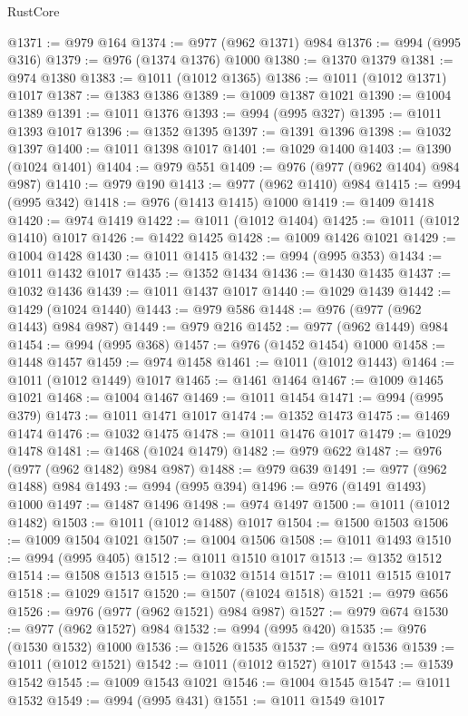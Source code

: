 \begin{lexlean}{RustCore}
\begin{coremodule}
@1371 := @979 @164
@1374 := @977 (@962 @1371) @984
@1376 := @994 (@995 @316)
@1379 := @976 (@1374 @1376) @1000
@1380 := @1370 @1379
@1381 := @974 @1380
@1383 := @1011 (@1012 @1365)
@1386 := @1011 (@1012 @1371) @1017
@1387 := @1383 @1386
@1389 := @1009 @1387 @1021
@1390 := @1004 @1389
@1391 := @1011 @1376
@1393 := @994 (@995 @327)
@1395 := @1011 @1393 @1017
@1396 := @1352 @1395
@1397 := @1391 @1396
@1398 := @1032 @1397
@1400 := @1011 @1398 @1017
@1401 := @1029 @1400
@1403 := @1390 (@1024 @1401)
@1404 := @979 @551
@1409 := @976 (@977 (@962 @1404) @984 @987)
@1410 := @979 @190
@1413 := @977 (@962 @1410) @984
@1415 := @994 (@995 @342)
@1418 := @976 (@1413 @1415) @1000
@1419 := @1409 @1418
@1420 := @974 @1419
@1422 := @1011 (@1012 @1404)
@1425 := @1011 (@1012 @1410) @1017
@1426 := @1422 @1425
@1428 := @1009 @1426 @1021
@1429 := @1004 @1428
@1430 := @1011 @1415
@1432 := @994 (@995 @353)
@1434 := @1011 @1432 @1017
@1435 := @1352 @1434
@1436 := @1430 @1435
@1437 := @1032 @1436
@1439 := @1011 @1437 @1017
@1440 := @1029 @1439
@1442 := @1429 (@1024 @1440)
@1443 := @979 @586
@1448 := @976 (@977 (@962 @1443) @984 @987)
@1449 := @979 @216
@1452 := @977 (@962 @1449) @984
@1454 := @994 (@995 @368)
@1457 := @976 (@1452 @1454) @1000
@1458 := @1448 @1457
@1459 := @974 @1458
@1461 := @1011 (@1012 @1443)
@1464 := @1011 (@1012 @1449) @1017
@1465 := @1461 @1464
@1467 := @1009 @1465 @1021
@1468 := @1004 @1467
@1469 := @1011 @1454
@1471 := @994 (@995 @379)
@1473 := @1011 @1471 @1017
@1474 := @1352 @1473
@1475 := @1469 @1474
@1476 := @1032 @1475
@1478 := @1011 @1476 @1017
@1479 := @1029 @1478
@1481 := @1468 (@1024 @1479)
@1482 := @979 @622
@1487 := @976 (@977 (@962 @1482) @984 @987)
@1488 := @979 @639
@1491 := @977 (@962 @1488) @984
@1493 := @994 (@995 @394)
@1496 := @976 (@1491 @1493) @1000
@1497 := @1487 @1496
@1498 := @974 @1497
@1500 := @1011 (@1012 @1482)
@1503 := @1011 (@1012 @1488) @1017
@1504 := @1500 @1503
@1506 := @1009 @1504 @1021
@1507 := @1004 @1506
@1508 := @1011 @1493
@1510 := @994 (@995 @405)
@1512 := @1011 @1510 @1017
@1513 := @1352 @1512
@1514 := @1508 @1513
@1515 := @1032 @1514
@1517 := @1011 @1515 @1017
@1518 := @1029 @1517
@1520 := @1507 (@1024 @1518)
@1521 := @979 @656
@1526 := @976 (@977 (@962 @1521) @984 @987)
@1527 := @979 @674
@1530 := @977 (@962 @1527) @984
@1532 := @994 (@995 @420)
@1535 := @976 (@1530 @1532) @1000
@1536 := @1526 @1535
@1537 := @974 @1536
@1539 := @1011 (@1012 @1521)
@1542 := @1011 (@1012 @1527) @1017
@1543 := @1539 @1542
@1545 := @1009 @1543 @1021
@1546 := @1004 @1545
@1547 := @1011 @1532
@1549 := @994 (@995 @431)
@1551 := @1011 @1549 @1017

\end{coremodule}
\end{lexlean}
